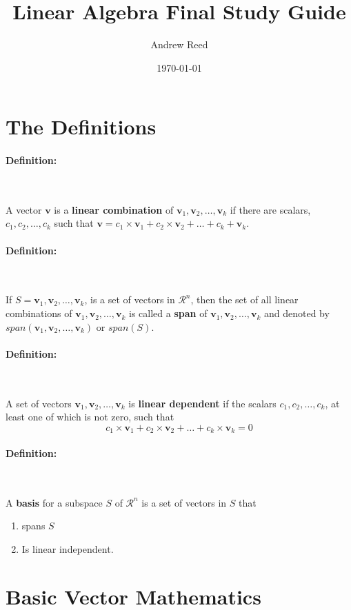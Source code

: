 \documentclass[12pt]{article}
\title{Linear Algebra Final Study Guide}
\author{Andrew Reed}
\date{\today}
\newenvironment{definition}{
	\paragraph{Definition: } 
	\hfill
	\\
	\indent  
}{\hfill}
\begin{document}
\maketitle

\section{The Definitions}

\begin{definition}
	A vector $\textbf{v}$ is a \textbf{linear combination} of $\textbf{v}_1, \textbf{v}_2, \dots, \textbf{v}_k$ if there are scalars, $c_1, c_2, \dots, c_k$ such that $\textbf{v} = c_1 \times \textbf{v}_1 + c_2 \times \textbf{v}_2 + \dots + c_k + \textbf{v}_k$.
\end{definition}

\begin{definition}
	If $S = {\textbf{v}_1, \textbf{v}_2, \dots, \textbf{v}_k}$, is a set of vectors in $\mathcal{R}^n$, then the set of all linear combinations of $\textbf{v}_1, \textbf{v}_2, \dots, \textbf{v}_k$ is called a \textbf{span} of $\textbf{v}_1, \textbf{v}_2, \dots, \textbf{v}_k$ and denoted by $span(\textbf{v}_1, \textbf{v}_2, \dots, \textbf{v}_k)$ or $span(S) $.
\end{definition}

\begin{definition}
	A set of vectors $\textbf{v}_1, \textbf{v}_2, \dots, \textbf{v}_k$ is \textbf{linear dependent} if the scalars $c_1, c_2, \dots, c_k$, at least one of which is not zero, such that
	\[
	c_1 \times \textbf{v}_1 + c_2 \times \textbf{v}_2 + \dots + c_k \times \textbf{v}_k = 0
	\]
\end{definition}

\begin{definition}
	A \textbf{basis} for a subspace $S$ of $\mathcal{R}^n$ is a set of vectors in $S$ that
	\begin{enumerate}
		\item spans $S$
		\item Is linear independent.
	\end{enumerate}
\end{definition}



\newpage


\section{Basic Vector Mathematics}
\end{document}
